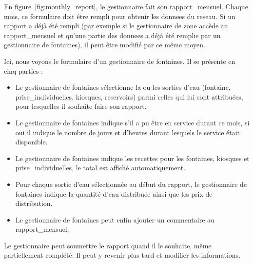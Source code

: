 \documentclass[a4paper, 11pt]{article}
\begin{document}
    En figure~\ref{fig:monthly_report}, le gestionnaire fait son \gls{rapport_mensuel}. Chaque mois, ce formulaire doit être rempli pour obtenir les \glspl{donnee} du \gls{reseau}. Si un rapport a déjà été rempli (par exemple si le gestionnaire de \gls{zone} accède au \gls{rapport_mensuel} et qu'une partie des \glspl{donnee} a déjà été remplie par un gestionnaire de \glspl{fontaine}), il peut être modifié par ce même moyen.

    Ici, nous voyons le formulaire d'un gestionnaire de \glspl{fontaine}. Il se présente en cinq parties :
    \begin{itemize}
      \item Le gestionnaire de \glspl{fontaine} sélectionne la ou les sorties d'eau (\gls{fontaine}, \glspl{prise_individuelle}, kiosques, \glspl{reservoir}) parmi celles qui lui sont attribuées, pour lesquelles il souhaite faire son rapport.
      \item Le gestionnaire de \glspl{fontaine} indique s'il a pu être en service durant ce mois, si oui il indique le nombre de jours et d'heures durant lesquels le service était disponible.
      \item Le gestionnaire de \glspl{fontaine} indique les recettes pour les \glspl{fontaine}, kiosques et \glspl{prise_individuelle}, le total est affiché automatiquement.
      \item Pour chaque sortie d'eau sélectionnée au début du rapport, le gestionnaire de \glspl{fontaine} indique la quantité d'eau distribuée ainsi que les prix de distribution.
      \item Le gestionnaire de \glspl{fontaine} peut enfin ajouter un commentaire au \gls{rapport_mensuel}.
    \end{itemize}

    Le gestionnaire peut soumettre le rapport quand il le souhaite, même partiellement complété. Il peut y revenir plus tard et modifier les informations.
\end{document}

